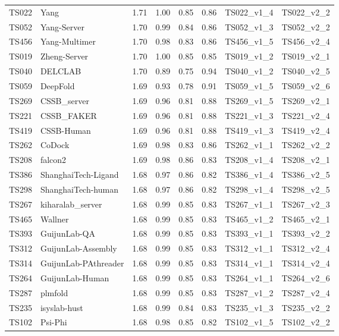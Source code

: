 \begin{table}[ht]
{\begin{tabular}{llllllll}
TS022 & Yang & 1.71 & 1.00 & 0.85 & 0.86 & TS022\_v1\_4 & TS022\_v2\_2 \\ 
TS052 & Yang-Server & 1.70 & 0.99 & 0.84 & 0.86 & TS052\_v1\_3 & TS052\_v2\_2 \\ 
TS456 & Yang-Multimer & 1.70 & 0.98 & 0.83 & 0.86 & TS456\_v1\_5 & TS456\_v2\_4 \\ 
TS019 & Zheng-Server & 1.70 & 1.00 & 0.85 & 0.85 & TS019\_v1\_2 & TS019\_v2\_1 \\ 
TS040 & DELCLAB & 1.70 & 0.89 & 0.75 & 0.94 & TS040\_v1\_2 & TS040\_v2\_5 \\ 
TS059 & DeepFold & 1.69 & 0.93 & 0.78 & 0.91 & TS059\_v1\_5 & TS059\_v2\_6 \\ 
TS269 & CSSB\_server & 1.69 & 0.96 & 0.81 & 0.88 & TS269\_v1\_5 & TS269\_v2\_1 \\ 
TS221 & CSSB\_FAKER & 1.69 & 0.96 & 0.81 & 0.88 & TS221\_v1\_3 & TS221\_v2\_4 \\ 
TS419 & CSSB-Human & 1.69 & 0.96 & 0.81 & 0.88 & TS419\_v1\_3 & TS419\_v2\_4 \\ 
TS262 & CoDock & 1.69 & 0.98 & 0.83 & 0.86 & TS262\_v1\_1 & TS262\_v2\_2 \\ 
TS208 & falcon2 & 1.69 & 0.98 & 0.86 & 0.83 & TS208\_v1\_4 & TS208\_v2\_1 \\ 
TS386 & ShanghaiTech-Ligand & 1.68 & 0.97 & 0.86 & 0.82 & TS386\_v1\_4 & TS386\_v2\_5 \\ 
TS298 & ShanghaiTech-human & 1.68 & 0.97 & 0.86 & 0.82 & TS298\_v1\_4 & TS298\_v2\_5 \\ 
TS267 & kiharalab\_server & 1.68 & 0.99 & 0.85 & 0.83 & TS267\_v1\_1 & TS267\_v2\_3 \\ 
TS465 & Wallner & 1.68 & 0.99 & 0.85 & 0.83 & TS465\_v1\_2 & TS465\_v2\_1 \\ 
TS393 & GuijunLab-QA & 1.68 & 0.99 & 0.85 & 0.83 & TS393\_v1\_1 & TS393\_v2\_2 \\ 
TS312 & GuijunLab-Assembly & 1.68 & 0.99 & 0.85 & 0.83 & TS312\_v1\_1 & TS312\_v2\_4 \\ 
TS314 & GuijunLab-PAthreader & 1.68 & 0.99 & 0.85 & 0.83 & TS314\_v1\_1 & TS314\_v2\_4 \\ 
TS264 & GuijunLab-Human & 1.68 & 0.99 & 0.85 & 0.83 & TS264\_v1\_1 & TS264\_v2\_6 \\ 
TS287 & plmfold & 1.68 & 0.99 & 0.85 & 0.83 & TS287\_v1\_2 & TS287\_v2\_4 \\ 
TS235 & isyslab-hust & 1.68 & 0.99 & 0.84 & 0.83 & TS235\_v1\_3 & TS235\_v2\_2 \\ 
TS102 & Psi-Phi & 1.68 & 0.98 & 0.85 & 0.82 & TS102\_v1\_5 & TS102\_v2\_2 \\ 

\end{tabular}}
\end{table}
